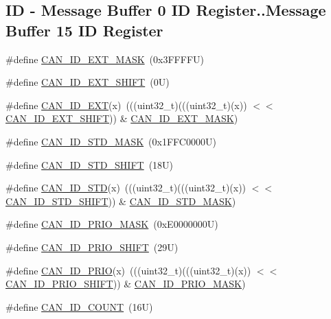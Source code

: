 \subsection*{ID -\/ Message Buffer 0 ID Register..Message Buffer 15 ID Register}
\begin{DoxyCompactItemize}
\item 
\#define \mbox{\hyperlink{group___c_a_n___register___masks_gacd238d5b88bd71a60ff7c00da7427be7}{C\+A\+N\+\_\+\+I\+D\+\_\+\+E\+X\+T\+\_\+\+M\+A\+SK}}~(0x3\+F\+F\+F\+F\+U)
\item 
\#define \mbox{\hyperlink{group___c_a_n___register___masks_gadd4a0522a5d856f631a2812cc8fe909c}{C\+A\+N\+\_\+\+I\+D\+\_\+\+E\+X\+T\+\_\+\+S\+H\+I\+FT}}~(0\+U)
\item 
\#define \mbox{\hyperlink{group___c_a_n___register___masks_gaa1bc82610ef65d7579d51e493537e226}{C\+A\+N\+\_\+\+I\+D\+\_\+\+E\+XT}}(x)~(((uint32\+\_\+t)(((uint32\+\_\+t)(x)) $<$$<$ \mbox{\hyperlink{group___c_a_n___register___masks_gadd4a0522a5d856f631a2812cc8fe909c}{C\+A\+N\+\_\+\+I\+D\+\_\+\+E\+X\+T\+\_\+\+S\+H\+I\+FT}})) \& \mbox{\hyperlink{group___c_a_n___register___masks_gacd238d5b88bd71a60ff7c00da7427be7}{C\+A\+N\+\_\+\+I\+D\+\_\+\+E\+X\+T\+\_\+\+M\+A\+SK}})
\item 
\#define \mbox{\hyperlink{group___c_a_n___register___masks_ga35a257f1f6dd8ee576becf1f05e995c2}{C\+A\+N\+\_\+\+I\+D\+\_\+\+S\+T\+D\+\_\+\+M\+A\+SK}}~(0x1\+F\+F\+C0000\+U)
\item 
\#define \mbox{\hyperlink{group___c_a_n___register___masks_gae8834f24b0aac84530ffd22f683ef5b4}{C\+A\+N\+\_\+\+I\+D\+\_\+\+S\+T\+D\+\_\+\+S\+H\+I\+FT}}~(18\+U)
\item 
\#define \mbox{\hyperlink{group___c_a_n___register___masks_ga67395c1778e9a7ba45f490a9b13db60b}{C\+A\+N\+\_\+\+I\+D\+\_\+\+S\+TD}}(x)~(((uint32\+\_\+t)(((uint32\+\_\+t)(x)) $<$$<$ \mbox{\hyperlink{group___c_a_n___register___masks_gae8834f24b0aac84530ffd22f683ef5b4}{C\+A\+N\+\_\+\+I\+D\+\_\+\+S\+T\+D\+\_\+\+S\+H\+I\+FT}})) \& \mbox{\hyperlink{group___c_a_n___register___masks_ga35a257f1f6dd8ee576becf1f05e995c2}{C\+A\+N\+\_\+\+I\+D\+\_\+\+S\+T\+D\+\_\+\+M\+A\+SK}})
\item 
\#define \mbox{\hyperlink{group___c_a_n___register___masks_gac1e36313ed3d0d09eec97537d3bda962}{C\+A\+N\+\_\+\+I\+D\+\_\+\+P\+R\+I\+O\+\_\+\+M\+A\+SK}}~(0x\+E0000000\+U)
\item 
\#define \mbox{\hyperlink{group___c_a_n___register___masks_ga7bd5cd878ee64f1b60ff983442ae7aa9}{C\+A\+N\+\_\+\+I\+D\+\_\+\+P\+R\+I\+O\+\_\+\+S\+H\+I\+FT}}~(29\+U)
\item 
\#define \mbox{\hyperlink{group___c_a_n___register___masks_gaeaa0dd64fdad35cb7c9565117e6f7a95}{C\+A\+N\+\_\+\+I\+D\+\_\+\+P\+R\+IO}}(x)~(((uint32\+\_\+t)(((uint32\+\_\+t)(x)) $<$$<$ \mbox{\hyperlink{group___c_a_n___register___masks_ga7bd5cd878ee64f1b60ff983442ae7aa9}{C\+A\+N\+\_\+\+I\+D\+\_\+\+P\+R\+I\+O\+\_\+\+S\+H\+I\+FT}})) \& \mbox{\hyperlink{group___c_a_n___register___masks_gac1e36313ed3d0d09eec97537d3bda962}{C\+A\+N\+\_\+\+I\+D\+\_\+\+P\+R\+I\+O\+\_\+\+M\+A\+SK}})
\item 
\#define \mbox{\hyperlink{group___c_a_n___register___masks_gaf210e18f559c3a9034ce180e9a3eb19b}{C\+A\+N\+\_\+\+I\+D\+\_\+\+C\+O\+U\+NT}}~(16\+U)
\end{DoxyCompactItemize}
